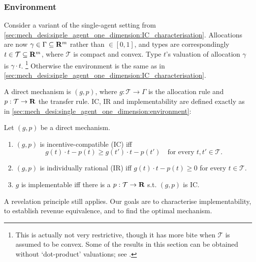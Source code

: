 \documentclass[11pt,letterpaper,reqno,oneside]{article}
\begin{document}
\subsubsection{Environment}
\label{sec:mech_desi:single_agent_multiple_dimensions:environment}

Consider a variant of the single-agent setting from \cref{sec:mech_desi:single_agent_one_dimension:IC_characterisation}. Allocations are now $\gamma \in \Gamma \subseteq \mathbf{R}^m$ rather than $\in [0,1]$, and types are correspondingly $t \in \mathcal{T} \subseteq \mathbf{R}^m$, where $\mathcal{T}$ is compact and convex. Type $t$'s valuation of allocation $\gamma$ is $\gamma \cdot t$.%
	\footnote{This is actually not very restrictive, though it has more bite when $\mathcal{T}$ is assumed to be convex. Some of the results in this section can be obtained without `dot-product' valuations; see \textcite[][ch. 4]{Vohra2011}.}
Otherwise the environment is the same as in \cref{sec:mech_desi:single_agent_one_dimension:IC_characterisation}.

A direct mechanism is $(g,p)$, where $g : \mathcal{T} \to \Gamma$ is the allocation rule and $p : \mathcal{T} \to \mathbf{R}$ the transfer rule. IC, IR and implementability are defined exactly as in \cref{sec:mech_desi:single_agent_one_dimension:environment}:
%
\begin{definition}
	Let $(g,p)$ be a direct mechanism.
	\begin{enumerate}

		\item $(g,p)$ is incentive-compatible (IC) iff
		\begin{equation*}
			g(t) \cdot t - p(t) \geq g(t') \cdot t - p(t')
			\quad\text{for every $t,t' \in \mathcal{T}$} .
		\end{equation*}

		\item $(g,p)$ is individually rational (IR) iff $g(t) \cdot t - p(t) \geq 0$ for every $t \in \mathcal{T}$.

		\item $g$ is implementable iff there is a $p : \mathcal{T} \to \mathbf{R}$ s.t. $(g,p)$ is IC.

	\end{enumerate}
\end{definition}

A revelation principle still applies. Our goals are to characterise implementability, to establish revenue equivalence, and to find the optimal mechanism.
\end{document}
